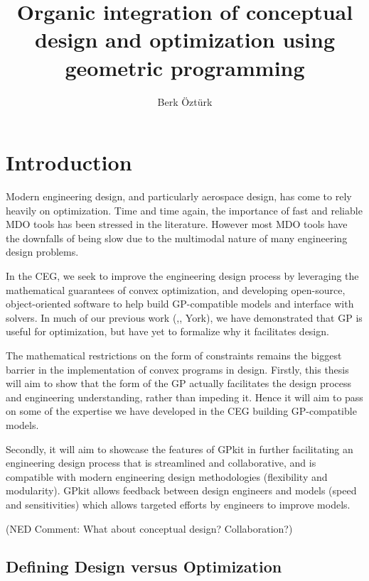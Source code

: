 \documentclass{aiaa-pretty}
\begin{document}
\title{Organic integration of conceptual design and optimization using geometric programming}
\author{Berk \"Ozt\"urk}
\maketitle

\section{\bf Introduction}

Modern engineering design, and particularly aerospace design, has come to rely heavily on optimization. Time and time again, the importance of fast and reliable MDO tools has been stressed in the literature. However most MDO tools have the downfalls of being slow due to the multimodal nature of many engineering design problems.  
	
In the \gls{CEG}, we seek to improve the engineering design process by leveraging the mathematical guarantees of convex optimization, and developing open-source, object-oriented software to help build GP-compatible models and interface with solvers. In much of our previous work (\cite{gp_ac_design},\cite{sp_ac_design}, York), we have demonstrated that \gls{GP} is useful for optimization, but have yet to formalize why it facilitates design.
 
The mathematical restrictions on the form of constraints remains the biggest barrier in the implementation of convex programs in design. Firstly, this thesis will aim to show that the form of the GP actually facilitates the design process and engineering understanding, rather than impeding it. Hence it will aim to pass on some of the expertise we have developed in the \gls{CEG} building \gls{GP}-compatible models. 

Secondly, it will aim to showcase the features of GPkit in further facilitating an engineering design process that is streamlined and collaborative, and is compatible with modern engineering design methodologies (flexibility and modularity). GPkit allows feedback between design engineers and models (speed and sensitivities) which allows targeted efforts by engineers to improve models. 

(NED Comment: What about conceptual design? Collaboration?)

\subsection{Defining Design versus Optimization}
\end{document}
